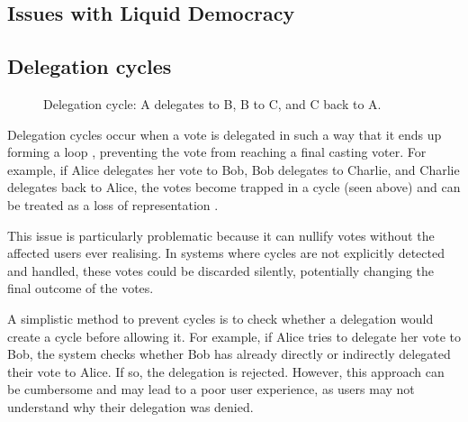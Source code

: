 
\subsection{Issues with Liquid Democracy}

\subsection*{Delegation cycles}
\begin{figure}[h]
    \centering
    \caption{Delegation cycle: A delegates to B, B to C, and C back to A.}
    \label{fig:triangle-cycle}
\end{figure}


Delegation cycles occur when a vote is delegated in such a way that it ends up forming a loop \citep{brill_liquid_2022}, preventing the vote from reaching a final casting voter. For example, if Alice delegates her vote to Bob, Bob delegates to Charlie, and Charlie delegates back to Alice, the votes become trapped in a cycle (seen above) and can be treated as a loss of representation \citep{christoff2017liquiddemocracyanalysisbinary}.

This issue is particularly problematic because it can nullify votes without the affected users ever realising. In systems where cycles are not explicitly detected and handled, these votes could be discarded silently, potentially changing the final outcome of the votes.

A simplistic method to prevent cycles is to check whether a delegation would create a cycle before allowing it. For example, if Alice tries to delegate her vote to Bob, the system checks whether Bob has already directly or indirectly delegated their vote to Alice. If so, the delegation is rejected. However, this approach can be cumbersome and may lead to a poor user experience, as users may not understand why their delegation was denied.

